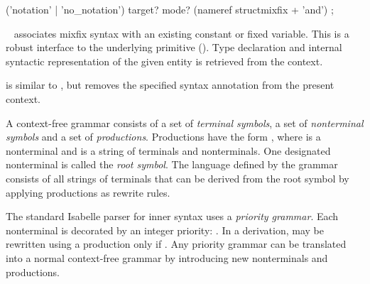 \begin{isabellebody}
\begin{isamarkuptext}
  \begin{rail}
    ('notation' | 'no\_notation') target? mode? (nameref structmixfix + 'and')
    ;
  \end{rail}

  \begin{description}

  \item \hyperlink{command.notation}{\mbox{}}~ associates mixfix
  syntax with an existing constant or fixed variable.  This is a
  robust interface to the underlying \hyperlink{command.syntax}{\mbox{}} primitive
  ().  Type declaration and internal syntactic
  representation of the given entity is retrieved from the context.
  
  \item \hyperlink{command.no-notation}{\mbox{}} is similar to \hyperlink{command.notation}{\mbox{}},
  but removes the specified syntax annotation from the present
  context.

  \end{description}%
\end{isamarkuptext}%
\isamarkuptrue%
%
\isamarkuptrue%
%
\isamarkuptrue%
%
\begin{isamarkuptext}%
A context-free grammar consists of a set of \emph{terminal
  symbols}, a set of \emph{nonterminal symbols} and a set of
  \emph{productions}.  Productions have the form ,
  where  is a nonterminal and \isa{{\isasymgamma}} is a string of
  terminals and nonterminals.  One designated nonterminal is called
  the \emph{root symbol}.  The language defined by the grammar
  consists of all strings of terminals that can be derived from the
  root symbol by applying productions as rewrite rules.

  The standard Isabelle parser for inner syntax uses a \emph{priority
  grammar}.  Each nonterminal is decorated by an integer priority:
  .  In a derivation,  may be rewritten
  using a production  only if .  Any
  priority grammar can be translated into a normal context-free
  grammar by introducing new nonterminals and productions.


\end{isamarkuptext}
\end{isabellebody}
